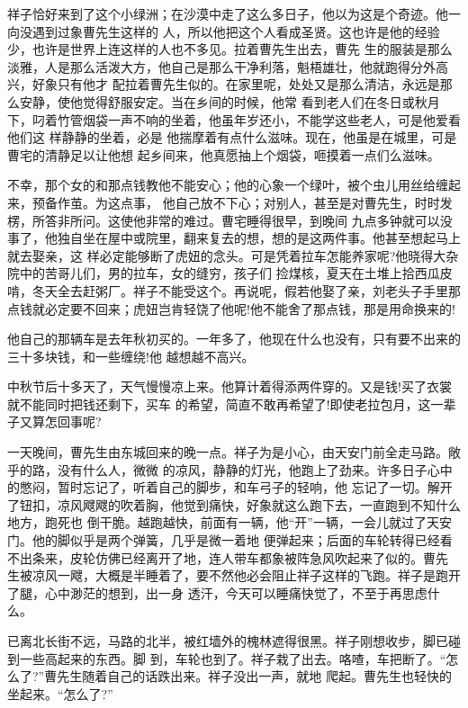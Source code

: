 \documentclass[11pt,a4paper,onecolumn]{article}
\begin{document}
祥子恰好来到了这个小绿洲；在沙漠中走了这么多日子，他以为这是个奇迹。他一向没遇到过象曹先生这样的
人，所以他把这个人看成圣贤。这也许是他的经验少，也许是世界上连这样的人也不多见。拉着曹先生出去，曹先
生的服装是那么淡雅，人是那么活泼大方，他自己是那么干净利落，魁梧雄壮，他就跑得分外高兴，好象只有他才
配拉着曹先生似的。在家里呢，处处又是那么清洁，永远是那么安静，使他觉得舒服安定。当在乡间的时候，他常
看到老人们在冬日或秋月下，叼着竹管烟袋一声不响的坐着，他虽年岁还小，不能学这些老人，可是他爱看他们这
样静静的坐着，必是 \myrule 他揣摩着\myrule 有点什么滋味。现在，他虽是在城里，可是曹宅的清静足以让他想
起乡间来，他真愿抽上个烟袋，咂摸着一点们么滋味。

不幸，那个女的和那点钱教他不能安心；他的心象一个绿叶，被个虫儿用丝给缠起来，预备作茧。为这点事，
他自己放不下心；对别人，甚至是对曹先生，时时发楞，所答非所问。这使他非常的难过。曹宅睡得很早，到晚间
九点多钟就可以没事了，他独自坐在屋中或院里，翻来复去的想，想的是这两件事。他甚至想起马上就去娶亲，这
样必定能够断了虎妞的念头。可是凭着拉车怎能养家呢?他晓得大杂院中的苦哥儿们，男的拉车，女的缝穷，孩子们
捡煤核，夏天在土堆上拾西瓜皮啃，冬天全去赶粥厂。祥子不能受这个。再说呢，假若他娶了亲，刘老头子手里那
点钱就必定要不回来；虎妞岂肯轻饶了他呢!他不能舍了那点钱，那是用命换来的!

他自己的那辆车是去年秋初买的。一年多了，他现在什么也没有，只有要不出来的三十多块钱，和一些缠绕!他
越想越不高兴。

中秋节后十多天了，天气慢慢凉上来。他算计着得添两件穿的。又是钱!买了衣裳就不能同时把钱还剩下，买车
的希望，简直不敢再希望了!即使老拉包月，这一辈子又算怎回事呢?

一天晚间，曹先生由东城回来的晚一点。祥子为是小心，由天安门前全走马路。敞乎的路，没有什么人，微微
的凉风，静静的灯光，他跑上了劲来。许多日子心中的憋闷，暂时忘记了，听着自己的脚步，和车弓子的轻响，他
忘记了一切。解开了钮扣，凉风飕飕的吹着胸，他觉到痛快，好象就这么跑下去，一直跑到不知什么地方，跑死也
倒干脆。越跑越快，前面有一辆，他``开''一辆，一会儿就过了天安门。他的脚似乎是两个弹簧，几乎是微一着地
便弹起来；后面的车轮转得已经看不出条来，皮轮仿佛已经离开了地，连人带车都象被阵急风吹起来了似的。曹先
生被凉风一飕，大概是半睡着了，要不然他必会阻止祥子这样的飞跑。祥子是跑开了腿，心中渺茫的想到，出一身
透汗，今天可以睡痛快觉了，不至于再思虑什么。

已离北长街不远，马路的北半，被红墙外的槐林遮得很黑。祥子刚想收步，脚已碰到一些高起来的东西。脚
到，车轮也到了。祥子栽了出去。咯喳，车把断了。``怎么了?''曹先生随着自己的话跌出来。祥子没出一声，就地
爬起。曹先生也轻快的坐起来。``怎么了?''
\end{document}
